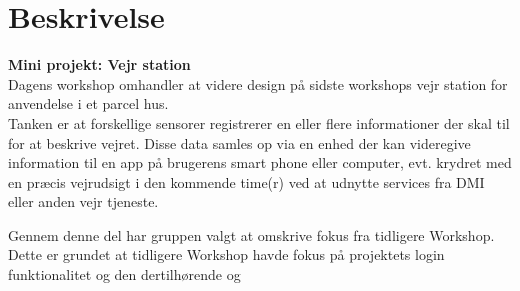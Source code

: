 \documentclass[11pt]{article}
\renewcommand{\baselinestretch}{1.20}
\begin{document}
    
    
    
    \renewcommand{\baselinestretch}{0.8}
    \tableofcontents
    \renewcommand{\baselinestretch}{1.20}
    
    \section{Beskrivelse}
    \textbf{Mini projekt: Vejr station}\\
    Dagens workshop omhandler at videre design på sidste workshops vejr station for anvendelse i et parcel hus. \\
    Tanken er at forskellige sensorer registrerer en eller flere informationer der skal til for at beskrive
    vejret. Disse data samles op via en enhed der kan videregive information til en app på brugerens smart
    phone eller computer, evt. krydret med en præcis vejrudsigt i den kommende time(r) ved at udnytte services fra DMI
    eller anden vejr tjeneste.
    
    Gennem denne del har gruppen valgt at omskrive fokus fra tidligere Workshop. Dette er grundet at tidligere Workshop havde fokus på projektets login funktionalitet og den dertilhørende  og 
    
    \newpage
    
    
    \newpage
    
\end{document}
